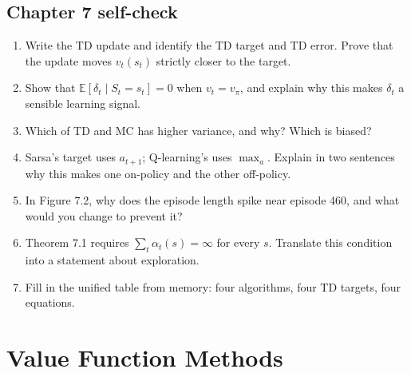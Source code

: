 \documentclass[11pt, letterpaper]{article}
\theoremstyle{runin}
\theoremstyle{runinplain}
\theoremstyle{remark}
\newcommand{\E}{\mathbb{E}}
\begin{document}
\subsection{Chapter 7 self-check}

\begin{enumerate}
  \item Write the TD update and identify the TD target and TD error. Prove that the
        update moves $v_t(s_t)$ strictly closer to the target.
  \item Show that $\E[\delta_t\mid S_t=s_t]=0$ when $v_t=v_\pi$, and explain why this
        makes $\delta_t$ a sensible learning signal.
  \item Which of TD and MC has higher variance, and why? Which is biased?
  \item Sarsa's target uses $a_{t+1}$; Q-learning's uses $\max_a$. Explain in two
        sentences why this makes one on-policy and the other off-policy.
  \item In Figure 7.2, why does the episode length spike near episode 460, and what
        would you change to prevent it?
  \item Theorem 7.1 requires $\sum_t\alpha_t(s)=\infty$ for every $s$. Translate this
        condition into a statement about exploration.
  \item Fill in the unified table from memory: four algorithms, four TD targets, four
        equations.
\end{enumerate}

\newpage
\section{Value Function Methods}
\end{document}
